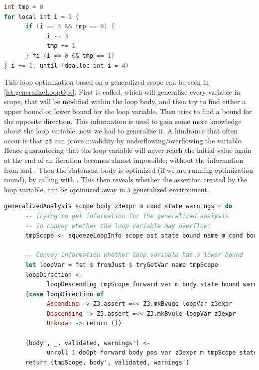 \begin{lstlisting}[language=C++, label=require-generalize, caption=Loop requirering generalization]
int tmp = 0
for local int i = 1 {
      if (i == 3 && tmp == 0) {
            i -= 3
            tmp += 1
      } fi (i == 0 && tmp == 1)
} i += 1, until (dealloc int i = 4)
\end{lstlisting}
\noindent
This loop optimization based on a generalized scope can be seen in
\autoref{lst:generalizeLoopOpt}.
First  is called, which will generalize every variable in scope, that
will be modified within the loop body, and then try to find either a upper bound or lower bound
for the loop variable. Then  tries to find a bound for the opposite
direction. This information is used to gain some more knowledge about the loop variable, now we
had to generalize it. A hindrance that often occur is that \texttt{z3} can prove invalidity by
underflowing/overflowing the variable.
Hence guaranteeing that the loop variable will never reach the initial value again at the end
of an iteration becomes almost impossible; without the information from  and
.
Then the statement body is optimized (if we are running optimization round), 
by calling  with . This then reveals whether the assertion
created by the loop variable, can be optimized away in a generalized environment.

\begin{lstlisting}[language=Haskell, label={lst:generalizeLoopOpt},
      caption={Optimizing the loop based on generalized information.}]
generalizedAnalysis scope body z3expr m cond state warnings = do
      -- Trying to get information for the generalized analysis
      -- To convey whether the loop variable may overflow!
      tmpScope <- squeezeLoopInfo scope ast state bound name m cond body forward

      -- Convey information whether loop variable has a lower bound
      let loopVar = fst $ fromJust $ tryGetVar name tmpScope
      loopDirection <-
            loopDescending tmpScope forward var m body state bound warnings
      (case loopDirection of
            Ascending -> Z3.assert =<< Z3.mkBvuge loopVar z3expr
            Descending -> Z3.assert =<< Z3.mkBvule loopVar z3expr
            Unknown -> return ())

      (body', _, validated, warnings') <-
            unroll 1 doOpt forward body pos var z3expr m tmpScope state warnings
      return (tmpScope, body', validated, warnings')
\end{lstlisting}

